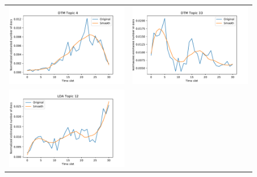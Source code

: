 \begin{figure}[h!]
\begin{center}
\begin{tabular}{cc}
\includegraphics[scale=.5]{DTMpopulationTopic4.pdf} &
\includegraphics[scale=.5]{DTMpopulationTopic33.pdf} \\
\includegraphics[scale=.5]{LDApopulationTopic12.pdf} &

\end{tabular}
\end{center}
\end{figure}
